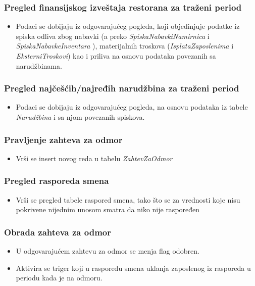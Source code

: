 \documentclass{article}
\begin{document}

\subsubsection{Pregled finansijskog izveštaja restorana za traženi period}
\begin{itemize}
\item  Podaci se dobijaju iz odgovarajućeg pogleda, koji objedinjuje podatke iz spiska odliva zbog nabavki (a preko \emph{SpiskaNabavkiNamirnica} i \emph{SpiskaNabavkeInventara} ), materijalnih troskova (\emph{IsplataZaposlenima} i \emph{EksterniTroskovi}) kao i priliva na osnovu podataka povezanih sa narudžbinama. 
\end{itemize}

\subsubsection{Pregled najčešćih/najređih narudžbina za traženi period}
\begin{itemize}
\item Podaci se dobijaju iz odgovarajućeg pogleda, na osnovu podataka iz tabele \emph{Narudžbina} i sa njom povezanih spiskova.
\end{itemize}


\subsubsection{Pravljenje zahteva za odmor}
\begin{itemize}
\item Vrši se insert novog reda u tabelu \emph{ZahtevZaOdmor} 
\end{itemize}

\subsubsection{Pregled rasporeda smena}
\begin{itemize}
\item Vrši se pregled tabele raspored smena, tako što se za vrednosti koje nisu pokrivene nijednim unosom smatra da niko nije raspoređen
\end{itemize}

\subsubsection{Obrada zahteva za odmor}
\begin{itemize}
\item U odgovarajućem zahtevu za odmor se menja flag odobren.
\item Aktivira se triger koji u rasporedu smena uklanja zaposlenog iz rasporeda u periodu kada je na odmoru.
\end{itemize}
\end{document}
